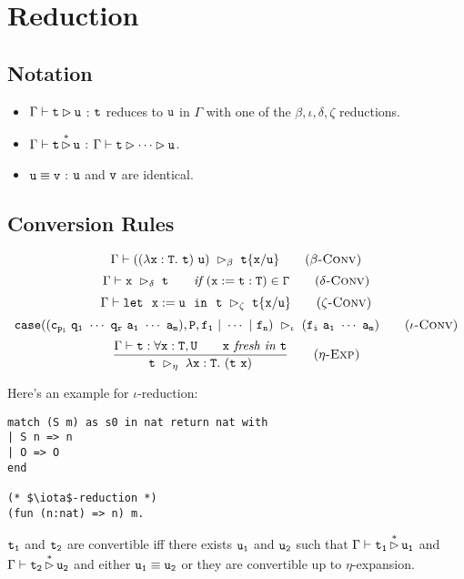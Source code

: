 \section{Reduction}

\subsection{Notation}
\begin{itemize}
    \item $\Gamma\vdash \tt t\rhd u$ : $\tt t$ reduces to $\tt u$ in $\Gamma$ with 
    one of the $\beta,\iota,\delta,\zeta$ reductions.
    \item $\Gamma\vdash \tt t\mathop{\rhd}\limits^* u$ : $\Gamma\vdash\tt t\rhd\cdots\rhd u$.
    \item $\tt u\equiv v$ : $\tt u$ and $\tt v$ are identical.
\end{itemize}

\subsection{Conversion Rules}
\begin{equation*}
    \Gamma\vdash\tt((\lambda x:T.\ t)\ u)\ \rhd_\beta\ t\{x/u\}
    \tag{\sc $\beta$-Conv}
\end{equation*}
\begin{equation*}
    \Gamma\vdash\tt x\ \rhd_\delta\ t\qquad \textit{if }(x:=t:T)\in\Gamma
    \tag{\sc $\delta$-Conv}
\end{equation*}
\begin{equation*}
\Gamma\vdash \tt let\ \ x:=u\ \ in\ \ t\ \rhd_\zeta\ t\{x/u\}
    \tag{\sc $\zeta$-Conv}
\end{equation*}
\begin{equation*}
    \tt case((c_{p_i}\ q_1\ \cdots\ q_r\ a_1\ \cdots\ a_m),P,f_1\ |\ \cdots\ |\ f_n)\ \rhd_\iota\ (f_i\ a_1\ \cdots\ a_m)
    \tag{\sc $\iota$-Conv}
\end{equation*}
\begin{equation*}
\frac{\Gamma\vdash \tt t:\forall x:T,U\qquad x\textit{ fresh in }t}
    {\tt t\ \rhd_\eta\ \lambda\tt x:T.\ (t\ x)}
    \tag{\sc $\eta$-Exp}
\end{equation*}

Here's an example for $\iota$-reduction:
\begin{center}
\begin{minipage}{0.7\textwidth}
\begin{verbatim}
match (S m) as s0 in nat return nat with
| S n => n
| O => O
end

(* $\iota$-reduction *)
(fun (n:nat) => n) m.
\end{verbatim}
\end{minipage}
\end{center}

\begin{Def}[Convertibility]
$\tt t_1$ and $\tt t_2$ are convertible iff there exists $\tt u_1$ and $\tt u_2$ such that 
$\Gamma\vdash \tt t_1\mathop{\rhd}\limits^* u_1$ and $\Gamma\vdash \tt t_2\mathop{\rhd}\limits^* u_2$ 
and either $\tt u_1\equiv u_2$ or they are convertible up to $\eta$-expansion.
\end{Def}

